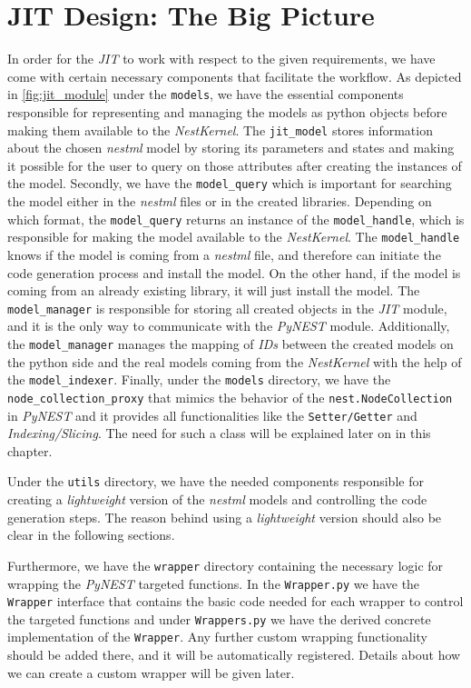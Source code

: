 

\section{JIT Design: The Big Picture}

In order for the \emph{JIT} to work with respect to the given requirements, we have come with certain necessary components that facilitate the workflow. As depicted in \autoref{fig:jit_module} under the \texttt{models}, we have the essential components responsible for representing and managing the models as python objects before making them available to the \emph{NestKernel}. The \texttt{jit\_model} stores information about the chosen \emph{nestml} model by storing its parameters and states and making it possible for the user to query on those attributes after creating the instances of the model. Secondly, we have the \texttt{model\_query} which is important for searching the model either in the \emph{nestml} files or in the created libraries. Depending on which format, the \texttt{model\_query} returns an instance of the \texttt{model\_handle}, which is responsible for making the model available to the \emph{NestKernel}. The  \texttt{model\_handle} knows if the model is coming from a \emph{nestml} file, and therefore can initiate the code generation process and install the model. On the other hand, if the model is coming from an already existing library, it will just install the model. The \texttt{model\_manager} is responsible for storing all created objects in the \emph{JIT} module, and it is the only way to communicate with the \emph{PyNEST} module. Additionally, the \texttt{model\_manager} manages the mapping of \emph{IDs} between the created models on the python side and the real models coming from the \emph{NestKernel} with the help of the \texttt{model\_indexer}. Finally, under the \texttt{models} directory, we have the \texttt{node\_collection\_proxy} that mimics the behavior of the \texttt{nest.NodeCollection} in \emph{PyNEST} and it provides all functionalities like the \texttt{Setter/Getter} and \emph{Indexing/Slicing}. The need for such a class will be explained later on in this chapter. 


Under the \texttt{utils} directory, we have the needed components responsible for creating a \emph{lightweight} version of the \emph{nestml} models and controlling the code generation steps. The reason behind using a \emph{lightweight} version should also be clear in the following sections.

Furthermore, we have the \texttt{wrapper} directory containing the necessary logic for wrapping the \emph{PyNEST} targeted functions. In the \texttt{Wrapper.py} we have the \texttt{Wrapper} interface that contains the basic code needed for each wrapper to control the targeted functions and under \texttt{Wrappers.py} we have the derived concrete implementation of the \texttt{Wrapper}. Any further custom wrapping functionality should be added there, and it will be automatically registered. Details about how we can create a custom wrapper will be given later.

